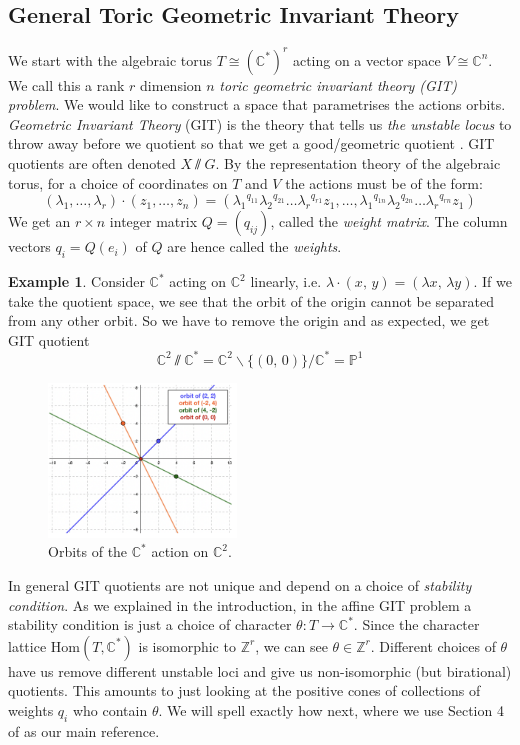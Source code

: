 \documentclass[oneside,reqno]{amsart}
\theoremstyle{definition}
\theoremstyle{definition}
\theoremstyle{definition}
\newtheorem{example}{Example} [section]
\theoremstyle{definition}
\newcommand{\CC}{\mathbb{C}}
\newcommand{\Z}{\mathbb{Z}}
\begin{document}
\subsection{General Toric Geometric Invariant Theory}
\label{GIT}
We start with the algebraic torus $T \cong (\mathbb{C}^*)^r$ acting on a vector space $V \cong \mathbb{C}^n$. We call this a rank $r$ dimension $n$ \textit{toric geometric invariant theory (GIT) problem}. We would like to construct a space that parametrises the actions orbits. \textit{Geometric Invariant Theory} (GIT) is the theory that tells us \textit{the unstable locus} to throw away before we quotient so that we get a good/geometric quotient \cite{mumford1994geometric}. GIT quotients are often denoted $X \sslash G$. By the representation theory of the algebraic torus, for a choice of coordinates on $T$ and $V$ the actions must be of the form:
$$
(\lambda_1, \dots, \lambda_r) \cdot (z_1, \dots, z_n) = ({\lambda_1}^{q_{11}}{\lambda_2}^{q_{21}}\dots {\lambda_r}^{q_{r1}} z_1, \dots, {\lambda_1}^{q_{1n}}{\lambda_2}^{q_{2n}}\dots {\lambda_r}^{q_{rn}} z_1)
$$
We get an $r \times n$ integer matrix $Q = (q_{ij})$, called the \textit{weight matrix}. The column vectors $q_i = Q(e_i)$ of $Q$ are hence called the \textit{weights}.
\begin{example}
  Consider $\mathbb{C}^*$ acting on $\mathbb{C}^2$ linearly, i.e. $\lambda \cdot (x, \, y) = (\lambda x,\, \lambda y)$.
  If we take the quotient space, we see that the orbit of the origin cannot be separated from any other orbit. So we have to remove the origin and as expected, we get  GIT quotient $$ \mathbb{C}^2 \sslash \mathbb{C}^* = \mathbb{C}^2 \backslash \{(0, \, 0)\} / \mathbb{C}^* = \mathbb{P}^1$$
  \begin{figure}[!h]
    \centering
    \includegraphics[width=5cm]{git/orbits of P1.png}
    \caption{Orbits of the $\mathbb{C}^*$ action on $\mathbb{C}^2$.}
  \end{figure}  
\end{example}
\noindent
In general GIT quotients are not unique and depend on a choice of \textit{stability condition}. As we explained in the introduction, in the affine GIT problem a stability condition is just a choice of character $\theta : T \to \CC^*$. Since the character lattice $\text{Hom}(T, \CC^*)$ is isomorphic to $ \Z^r$, we can see $\theta \in \mathbb{Z}^r$. Different choices of $\theta$ have us remove different unstable loci and give us non-isomorphic (but birational) quotients. This amounts to just looking at the positive cones of collections of weights $q_i$ who contain $\theta$. We will spell exactly how next, where we use Section 4 of \cite{coates2018crepant} as our main reference. \\
\end{document}
